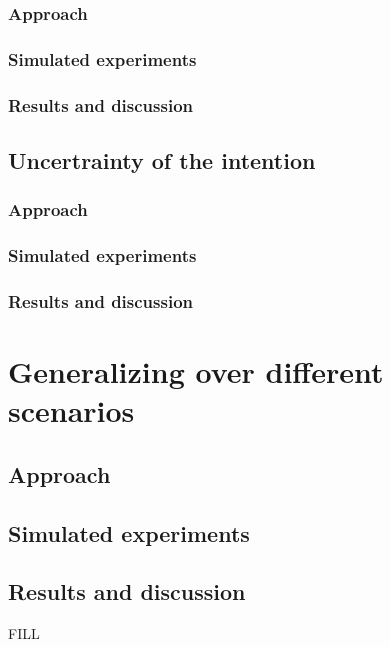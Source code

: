 \subsection{Approach}
\subsection{Simulated experiments}
\subsection{Results and discussion}

\section{Uncertrainty of the intention}
\subsection{Approach}
\subsection{Simulated experiments}
\subsection{Results and discussion}


\chapter{Generalizing over different scenarios}
\section{Approach}
\section{Simulated experiments}
\section{Results and discussion}
FILL